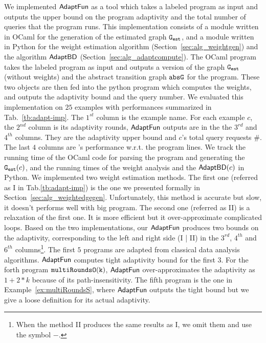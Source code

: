 We implemented $\textsf{AdaptFun}$ as a tool which takes a labeled program as input
and outputs the upper bound on the program adaptivity and the total number of queries that the program runs.
This implementation consists of a module written in OCaml for the generation of the estimated graph $\mathtt{{G_{est}}}$, and a module written in Python for the weight estimation algorithm (Section~\ref{sec:alg_weightgen}) and the algorithm $\mathsf{AdaptBD}$ (Section~\ref{sec:alg_adaptcompute}).
The OCaml program takes the labeled program as input and outputs a version of the graph $\mathtt{{G_{est}}}$ (without weights) and the abstract transition graph $\mathtt{abs}{\mathtt{G}}$ for the program. These two objects are then
fed into the python program which computes the weights, and outputs the adaptivity bound and the query number.
%
We evaluated this implementation on $25$ examples with performances summarized in Tab.~\ref{tb:adapt-imp}.
The $1^{st}$ column is the example name.
For each example $c$, the $2^{nd}$ column is its adaptivity rounds,
$\textsf{AdaptFun}$ outputs are in the the $3^{rd}$ and $4^{th}$ columns. They are
the adaptivity upper bound and
$c$'s total query requests \#. 
The last $4$ columns are {\THESYSTEM}'s performance w.r.t. the program lines.
We track the running time of the OCaml code for parsing the program and generating the $\mathtt{{G_{est}}}(c)$,
and the running times of the weight analysis
and the $\mathsf{AdaptBD}(c)$ in Python.
We implemented two weight estimation methods. The first one (referred as I in Tab.\ref{tb:adapt-imp}) is the one we presented formally in Section~\ref{sec:alg_weightedgegen}. Unfortunately, this method is accurate but slow, it doesn't performs well with big program. The second one (referred as II) is a relaxation of the first one. It is more  efficient but it over-approximate complicated loops. Based on the two implementations, our $\textsf{AdaptFun}$ produces two bounds on the adaptivity, corresponding to the left and right side (I | II) in the $3^{rd}$, $4^{th}$ and $6^{th}$ columns\footnote{When the method II produces the same results as I, we omit them and use the symbol $-$.}.
%
The first $5$ programs are adapted from classical data analysis algorithms.
$\textsf{AdaptFun}$ computes tight adaptivity bound for the first 3.
For the forth program $\mathtt{multiRoundsO(k)}$, $\textsf{AdaptFun}$ over-approximates the adaptivity as $1 + 2*k$ because of its path-insensitivity.
The fifth program is the one in Example~\ref{ex:multiRoundsS}, where $\textsf{AdaptFun}$ outputs the tight bound but we give a loose definition for its actual adaptivity.
